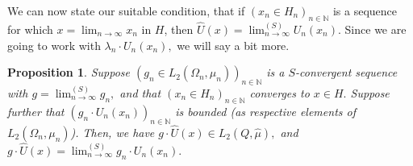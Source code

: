 \documentclass[10pt,a4paper]{amsart}
\newtheorem{prop}[thm]{Proposition}
\def \HMU{\hat{\mu}}
\def \HU{\hat{U}}
\begin{document}
We can now state our suitable condition, that if $(x_n\in H_n)_{n\in\mathbb{N}}$ is a sequence for which $x=\lim_{n\rightarrow\infty} x_n$ in $H$, then $\HU(x)=\lim^{(S)}_{n\rightarrow\infty} U_n(x_n).$  Since we are going to work with $\lambda_n\cdot U_n(x_n),$ we will say a bit more.

\begin{prop}\label{proposition_converging_isometry}
	Suppose $(g_n\in L_2(\Omega_n,\mu_n))_{n\in\mathbb{N}}$ is a $S$-convergent sequence with $g=\lim^{(S)}_{n\rightarrow\infty}g_n,$ and that $(x_n\in H_n)_{n\in\mathbb{N}}$ converges to $x\in H.$ Suppose further that $(g_n\cdot U_n(x_n))_{n\in\mathbb{N}}$ is bounded (as respective elements of $L_2(\Omega_n,\mu_n)$). Then, we have $g\cdot\HU(x)\in L_2(Q,\HMU),$ and $g\cdot \HU(x)=\lim^{(S)}_{n\rightarrow\infty} g_n\cdot U_n(x_n).$ 
\end{prop}
\end{document}
